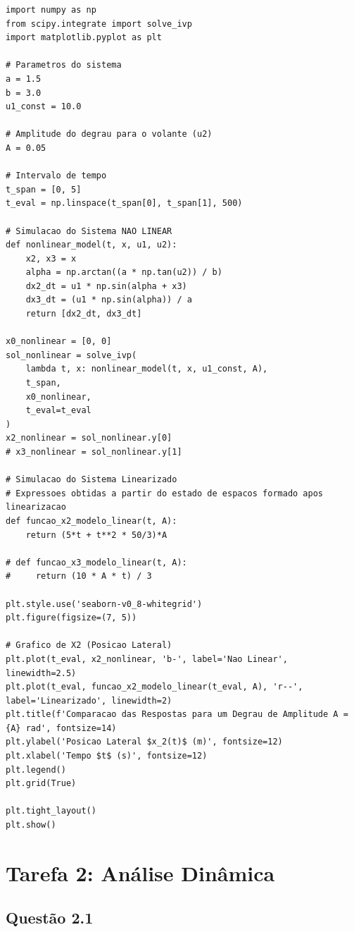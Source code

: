 \documentclass[a4paper,11pt]{article}
\begin{document}
\begin{lstlisting}[caption = {Código da Questão 1.4}]
import numpy as np
from scipy.integrate import solve_ivp
import matplotlib.pyplot as plt

# Parametros do sistema
a = 1.5
b = 3.0
u1_const = 10.0 

# Amplitude do degrau para o volante (u2)
A = 0.05 

# Intervalo de tempo
t_span = [0, 5]
t_eval = np.linspace(t_span[0], t_span[1], 500)

# Simulacao do Sistema NAO LINEAR
def nonlinear_model(t, x, u1, u2):
    x2, x3 = x
    alpha = np.arctan((a * np.tan(u2)) / b)
    dx2_dt = u1 * np.sin(alpha + x3)
    dx3_dt = (u1 * np.sin(alpha)) / a
    return [dx2_dt, dx3_dt]

x0_nonlinear = [0, 0]
sol_nonlinear = solve_ivp(
    lambda t, x: nonlinear_model(t, x, u1_const, A),
    t_span,
    x0_nonlinear,
    t_eval=t_eval
)
x2_nonlinear = sol_nonlinear.y[0]
# x3_nonlinear = sol_nonlinear.y[1]

# Simulacao do Sistema Linearizado
# Expressoes obtidas a partir do estado de espacos formado apos linearizacao
def funcao_x2_modelo_linear(t, A):
    return (5*t + t**2 * 50/3)*A

# def funcao_x3_modelo_linear(t, A):
#     return (10 * A * t) / 3

plt.style.use('seaborn-v0_8-whitegrid')
plt.figure(figsize=(7, 5))

# Grafico de X2 (Posicao Lateral)
plt.plot(t_eval, x2_nonlinear, 'b-', label='Nao Linear', linewidth=2.5)
plt.plot(t_eval, funcao_x2_modelo_linear(t_eval, A), 'r--', label='Linearizado', linewidth=2)
plt.title(f'Comparacao das Respostas para um Degrau de Amplitude A = {A} rad', fontsize=14)
plt.ylabel('Posicao Lateral $x_2(t)$ (m)', fontsize=12)
plt.xlabel('Tempo $t$ (s)', fontsize=12)
plt.legend()
plt.grid(True)

plt.tight_layout()
plt.show()
\end{lstlisting}

\newpage

\section*{\sc Tarefa 2: Análise Dinâmica}

\subsection*{\sc Questão 2.1}
\end{document}
